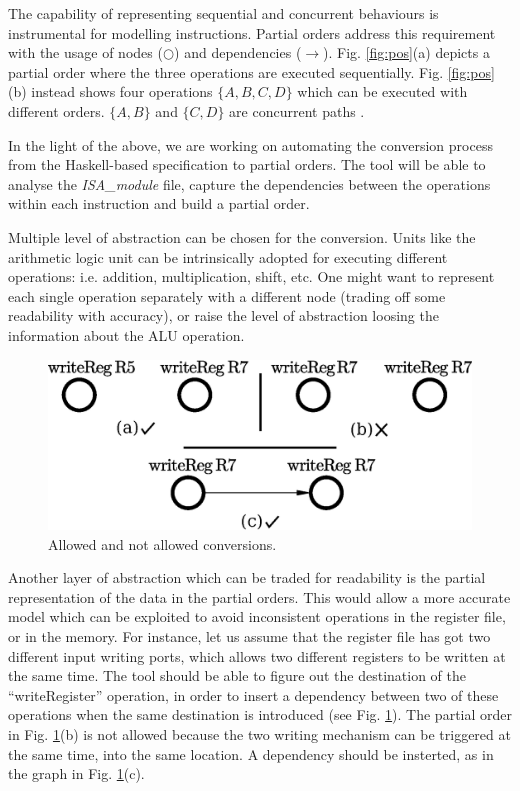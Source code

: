 \documentclass[conference]{IEEEtran}
\begin{document}
The capability of representing sequential and concurrent behaviours is instrumental for
modelling instructions. Partial orders address this requirement with the usage of nodes
($\bigcirc$) and dependencies ($\rightarrow$). Fig. \ref{fig:pos}(a) depicts a partial order
where the three operations are executed sequentially. Fig. \ref{fig:pos}(b) instead shows
four operations $\lbrace A,B,C,D \rbrace$ which can be executed with different orders. 
$\lbrace A,B \rbrace$ and $\lbrace C,D \rbrace$ are concurrent paths \cite{andreyPhd}.

In the light of the above, we are working on automating the conversion process from the
Haskell-based specification to partial orders. The tool will be able to analyse the
\textit{ISA\_module} file, capture the dependencies between the operations within each
instruction and build a partial order. 

Multiple level of abstraction can be chosen for the conversion. Units like the
arithmetic logic unit can be intrinsically adopted for executing
different operations: i.e. addition, multiplication, shift, etc. One might want to represent
each single operation separately with a different node 
(trading off some readability with accuracy), or raise the
level of abstraction loosing the information about the ALU operation.

\begin{figure}[ht!]
\begin{center}
	\includegraphics[width=\linewidth]{IMG/depPO.eps}
	\caption{Allowed and not allowed conversions.}
	\label{fig:depPO}
\end{center}
\end{figure}

Another layer of abstraction which can be traded for readability is the partial
representation of the data in the partial orders. This would allow a more accurate model
which can be exploited to avoid inconsistent operations in the register file, or in the
memory. For instance, let us assume that the register file has got two different input
writing ports, which allows two different registers to be written at the same time. The tool
should be able to figure out the destination of the ``writeRegister'' operation, in order to
insert a dependency between two of these operations when the same destination is introduced
(see Fig. \ref{fig:depPO}). The partial order in Fig. \ref{fig:depPO}(b) is not allowed
because the two writing mechanism can be triggered at the same time, into the same location.
A dependency should be insterted, as in the graph in Fig. \ref{fig:depPO}(c).
\end{document}
